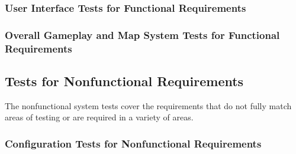 \documentclass[12pt, titlepage]{article}
\newcounter{SFT}[subsubsection]
\begin{document}


\subsubsection{User Interface Tests for Functional Requirements}



\subsubsection{Overall Gameplay and Map System Tests for Functional 
Requirements}



\subsection{Tests for Nonfunctional Requirements}
The nonfunctional system tests cover the requirements that do not fully match areas of testing or are required in a variety of areas.






\subsubsection{Configuration Tests for Nonfunctional Requirements}
\end{document}
